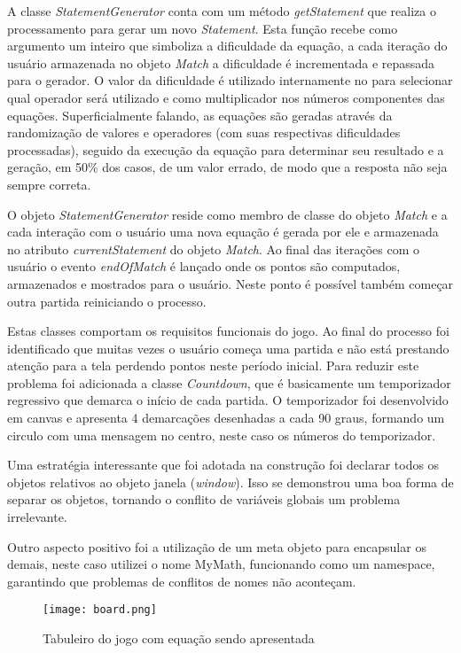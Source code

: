 \begin{draft}
A classe \textit{StatementGenerator} conta com um método
\textit{getStatement} que realiza o processamento para gerar um novo
\textit{Statement}. Esta função recebe como argumento um inteiro que
simboliza a dificuldade da equação, a cada iteração do usuário
armazenada no objeto \textit{Match} a dificuldade é incrementada
e repassada para o gerador. O valor da dificuldade é utilizado
internamente no para selecionar qual operador será utilizado e como
multiplicador nos números componentes das equações. Superficialmente
falando, as equações são geradas através da randomização de
valores e operadores (com suas respectivas dificuldades processadas),
seguido da execução da equação para determinar seu resultado e a
geração, em 50\% dos casos, de um valor errado, de modo que a resposta
não seja sempre correta. 

O objeto \textit{StatementGenerator} reside como membro de classe
do objeto \textit{Match} e a cada interação com o usuário
uma nova equação é gerada por ele e armazenada no atributo
\textit{currentStatement} do objeto \textit{Match}. Ao final das iterações com
o usuário o evento \textit{endOfMatch} é lançado onde os pontos são
computados, armazenados e mostrados para o usuário. Neste ponto é
possível também começar outra partida reiniciando o processo.

Estas classes comportam os requisitos funcionais do jogo. Ao final
do processo foi identificado que muitas vezes o usuário começa uma
partida e não está prestando atenção para a tela perdendo pontos
neste período inicial. Para reduzir este problema foi adicionada 
a classe \textit{Countdown}, que é basicamente um temporizador regressivo que 
demarca o início de cada partida. O temporizador foi desenvolvido em canvas
e apresenta 4 demarcações desenhadas a cada 90 graus, formando um circulo com uma
mensagem no centro, neste caso os números do temporizador.

Uma estratégia interessante que foi adotada na construção foi
declarar todos os objetos relativos ao objeto janela (\textit{window}).
Isso se demonstrou uma boa forma de separar os objetos, tornando o
conflito de variáveis globais um problema irrelevante.

Outro aspecto positivo foi a utilização de um meta objeto para
encapsular os demais, neste caso utilizei o nome MyMath, funcionando
como um namespace, garantindo que problemas de conflitos de nomes não
aconteçam.

\end{draft}
\begin{figure}
    \centering
    \texttt{[image: board.png]}
	\caption{Tabuleiro do jogo com equação sendo apresentada}
    \label{fig:tabuleiro}
\end{figure}

